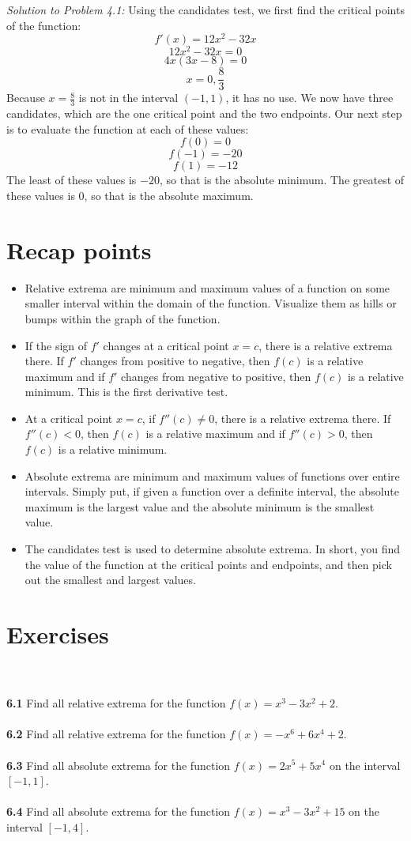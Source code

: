 \documentclass[11pt]{scrartcl}
\begin{document}
\noindent 
\textit{Solution to Problem 4.1:} Using the candidates test, we first find the critical points of the function: 
$$f'(x)=12x^2-32x$$
$$12x^2-32x=0$$
$$4x(3x-8)=0$$
$$x=0,\frac{8}{3}$$
\noindent 
Because $x=\frac{8}{3}$ is not in the interval $(-1,1)$, it has no use. 
We now have three candidates, which are the one critical point and the two endpoints. Our next step is to evaluate the function at each of these values: 
$$f(0)=0$$
$$f(-1)=-20$$
$$f(1)=-12$$
\noindent 
The least of these values is $-20$, so that is the absolute minimum. The greatest of these values is $0$, so that is the absolute maximum. 
\section{Recap points}
\begin{itemize}
    \item Relative extrema are minimum and maximum values of a function on some smaller interval within the domain of the function. Visualize them as hills or bumps within the graph of the function. 
    \item If the sign of $f'$ changes at a critical point $x=c$, there is a relative extrema there. If $f'$ changes from positive to negative, then $f(c)$ is a relative maximum and if $f'$ changes from negative to positive, then $f(c)$ is a relative minimum. This is the first derivative test. 
    \item At a critical point $x=c$, if $f''(c) \neq 0$, there is a relative extrema there. If $f''(c)<0$, then $f(c)$ is a relative maximum and if $f''(c)>0$, then $f(c)$ is a relative minimum. 
    \item Absolute extrema are minimum and maximum values of functions over entire intervals. Simply put, if given a function over a definite interval, the absolute maximum is the largest value and the absolute minimum is the smallest value. 
    \item The candidates test is used to determine absolute extrema. In short, you find the value of the function at the critical points and endpoints, and then pick out the smallest and largest values. 
\end{itemize}

\section{Exercises} \\
\\
\noindent 
\textbf{6.1} Find all relative extrema for the function $f(x)=x^3-3x^2+2$. \\
\\
\noindent 
\textbf{6.2} Find all relative extrema for the function $f(x)=-x^6+6x^4+2$. \\
\\
\noindent 
\textbf{6.3}  Find all absolute extrema for the function $f(x)=2x^5+5x^4$ on the interval $[-1,1]$. \\
\\
\noindent 
\textbf{6.4} Find all absolute extrema for the function $f(x)=x^3-3x^2+15$ on the interval $[-1,4]$.
\end{document}
